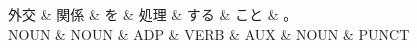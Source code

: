 \documentclass[tikz,border=5pt]{standalone}
\begin{document}
\normalsize
\begin{dependency}[edge unit distance=12.0pt]
    \begin{deptext}[column sep=1em]
        外交 \& 関係 \& を \& 処理 \& する \& こと \& 。\\
        NOUN \& NOUN \& ADP \& VERB \& AUX \& NOUN \& PUNCT\\
    \end{deptext}
\end{dependency}
\end{document}
